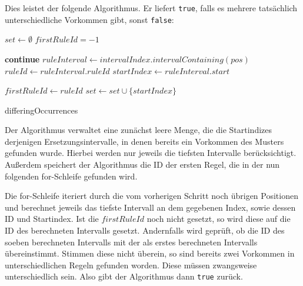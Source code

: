 Dies leistet der folgende Algorithmus. Er liefert \texttt{true}, falls es mehrere tatsächlich unterschiedliche Vorkommen gibt, sonst \texttt{false}:

\begin{algorithm}
    $set \leftarrow \emptyset$\;
    $firstRuleId = -1$\;
     {
         { 
            \textbf{continue}\;
        }
        $ruleInterval \leftarrow intervalIndex.intervalContaining(pos)$\;
        $ruleId \leftarrow ruleInterval.ruleId$\;
        $startIndex \leftarrow ruleInterval.start$\;

         {
            $firstRuleId \leftarrow ruleId$\;
        }
         {
        }
        $set \leftarrow set \cup \{startIndex\}$\;
    }
    
    \caption{differingOccurrences}
\end{algorithm}

Der Algorithmus verwaltet eine zunächst leere Menge, die die Startindizes derjenigen Ersetzungsintervalle, in denen bereits ein Vorkommen des Musters gefunden wurde. Hierbei werden nur jeweils die tiefsten Intervalle berücksichtigt. Außerdem speichert der Algorithmus die ID der ersten Regel, die in der nun folgenden for-Schleife gefunden wird.

Die for-Schleife iteriert durch die vom vorherigen Schritt noch übrigen Positionen und berechnet jeweils das tiefste Intervall an dem gegebenen Index, sowie dessen ID und Startindex. Ist die $firstRuleId$ noch nicht gesetzt, so wird diese auf die ID des berechneten Intervalls gesetzt. Andernfalls wird geprüft, ob die ID des soeben berechneten Intervalls mit der als erstes berechneten Intervalls übereinstimmt. Stimmen diese nicht überein, so sind bereits zwei Vorkommen in unterschiedlichen Regeln gefunden worden. Diese müssen zwangsweise unterschiedlich sein. Also gibt der Algorithmus dann \texttt{true} zurück.

